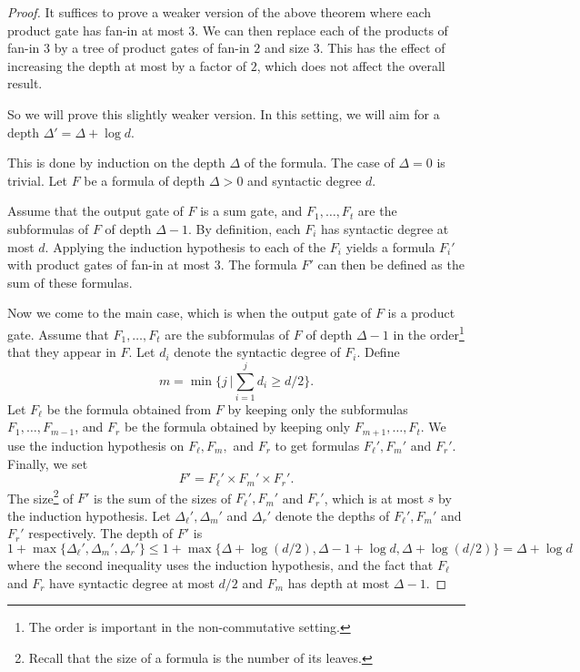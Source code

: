 \documentclass[10pt,a4paper]{article}
\begin{document}
\begin{proof}
	It suffices to prove a weaker version of the above theorem where each product gate has fan-in at most $3$. We can then replace each of the products of fan-in $3$ by a tree of product gates of fan-in $2$ and size $3$. This has the effect of increasing the depth at most by a factor of $2$, which does not affect the overall result. 
	
	So we will prove this slightly weaker version. In this setting, we will aim for a depth $\Delta' = \Delta + \log d.$
	
	This is done by induction on the depth $\Delta$ of the formula. The case of $\Delta = 0$ is trivial. Let $F$ be a formula of depth $\Delta > 0$ and syntactic degree $d$.
	
	Assume that the output gate of $F$ is a sum gate, and $F_1,\ldots, F_t$ are the subformulas of $F$ of depth $\Delta -1$. By definition, each $F_i$ has syntactic degree at most $d$. Applying the induction hypothesis to each of the $F_i$ yields a formula $F_i'$ with product gates of fan-in at most $3$. The formula $F'$ can then be defined as the sum of these formulas. 
	
	Now we come to the main case, which is when the output gate of $F$ is a product gate. Assume that $F_1,\ldots, F_t$ are the subformulas of $F$ of depth $\Delta -1$ in the order\footnote{The order is important in the non-commutative setting.} that they appear in $F$. Let $d_i$ denote the syntactic degree of $F_i$. Define 
	\[
	m = \min\{j \ | \sum_{i= 1}^j d_i \geq d/2\}.
	\]
	Let $F_\ell$ be the formula obtained from $F$ by keeping only the subformulas $F_1,\ldots,F_{m-1}$, and $F_r$ be the formula obtained by keeping only $F_{m+1},\ldots,F_t.$ We use the induction hypothesis on $F_\ell, F_m,$ and $F_r$ to get formulas $F_\ell', F_m'$ and $F_r'$. Finally, we set 
	\[
	F' = F_\ell' \times F_m' \times F_r'.
	\]
	The size\footnote{Recall that the size of a formula is the number of its leaves.} of $F'$ is the sum of the sizes of $F_\ell', F_m'$ and $F_r'$, which is at most $s$ by the induction hypothesis. Let $\Delta_\ell', \Delta_m'$ and $\Delta_r'$ denote the depths of $F_\ell', F_m'$ and $F_r'$ respectively. The depth of $F'$ is 
	\[
	1+\max\{ \Delta_\ell', \Delta_m', \Delta_r'\} \leq 1+ \max\{\Delta + \log(d/2), \Delta-1 + \log d, \Delta + \log(d/2)\} = \Delta + \log d
	\]
	where the second inequality uses the induction hypothesis, and the fact that $F_{\ell}$ and $F_r$ have syntactic degree at most $d/2$ and $F_m$ has depth at most $\Delta-1.$
\end{proof}
\end{document}
